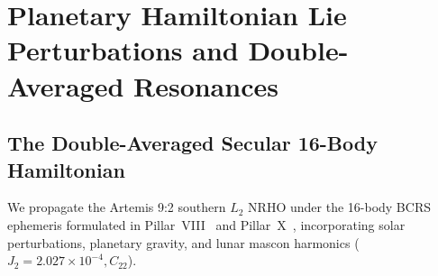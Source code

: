\documentclass[11pt,a4paper,reqno]{article}
\theoremstyle{plain}
\theoremstyle{definition}
\theoremstyle{remark}
\numberwithin{equation}{section}
\begin{document}
\section{Planetary Hamiltonian Lie Perturbations and Double-Averaged Resonances}
\label{sec:planetary_lie_perturbations}

\subsection{The Double-Averaged Secular 16-Body Hamiltonian}
We propagate the Artemis 9:2 southern $L_2$ NRHO under the 16-body BCRS ephemeris formulated in Pillar~VIII~\cite{PillarVIIIPreprint} and Pillar~X~\cite{PillarXPreprint}, incorporating solar perturbations, planetary gravity, and lunar mascon harmonics ($J_2 = 2.027 \times 10^{-4}, C_{22}$).
\end{document}
